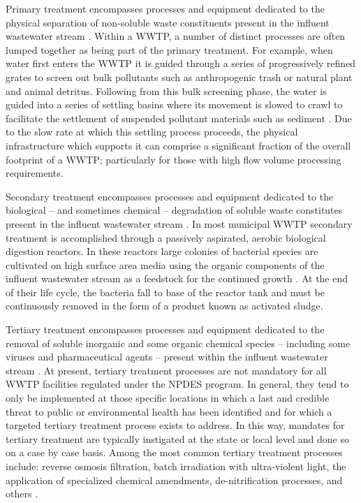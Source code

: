 Primary treatment encompasses processes and equipment dedicated to the physical separation of non-soluble waste constituents present in the influent wastewater stream \cite{Metcalf1991}. Within a WWTP, a number of distinct processes are often lumped together as being part of the primary treatment. For example, when water first enters the WWTP it is guided through a series of progressively refined grates to screen out bulk pollutants such as anthropogenic trash or natural plant and animal detritus. Following from this bulk screening phase, the water is guided into a series of settling basins where its movement is slowed to crawl to facilitate the settlement of suspended pollutant materials such as sediment \cite{Metcalf1991}. Due to the slow rate at which this settling process proceeds, the physical infrastructure which supports it can comprise a significant fraction of the overall footprint of a WWTP; particularly for those with high flow volume processing requirements.

Secondary treatment encompasses processes and equipment dedicated to the biological -- and sometimes chemical -- degradation of soluble waste constitutes present in the influent wastewater stream \cite{Metcalf1991}. In most municipal WWTP secondary treatment is accomplished through a passively aspirated, aerobic biological digestion reactors. In these reactors large colonies of bacterial species are cultivated on high surface area media using the organic components of the influent wastewater stream as a feedstock for the continued growth \cite{Metcalf1991}. At the end of their life cycle, the bacteria fall to base of the reactor tank and must be continuously removed in the form of a product known as activated sludge.

Tertiary treatment encompasses processes and equipment dedicated to the removal of soluble inorganic and some organic chemical species -- including some viruses and pharmaceutical agents -- present within the influent wastewater stream \cite{Metcalf1991}. At present, tertiary treatment processes are not mandatory for all WWTP facilities regulated under the NPDES program. In general, they tend to only be implemented at those specific locations in which a last and credible threat to public or environmental health has been identified and for which a targeted tertiary treatment process exists to address. In this way, mandates for tertiary treatment are typically instigated at the state or local level and done so on a case by case basis. Among the most common tertiary treatment processes include: reverse osmosis filtration, batch irradiation with ultra-violent light, the application of specialized chemical amendments, de-nitrification processes, and others \cite{Metcalf1991}.

